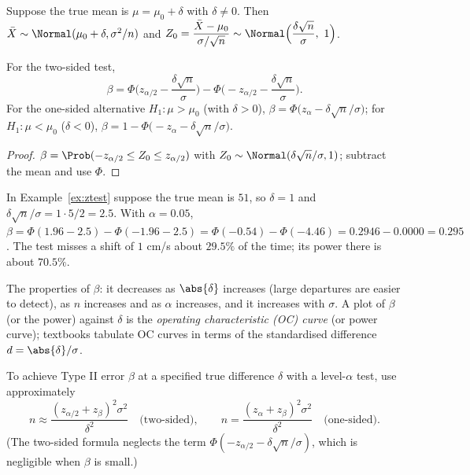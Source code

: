 Suppose the true mean is $\mu=\mu_0+\delta$ with $\delta\ne0$. Then $\bar{X}\sim\Normal(\mu_0+\delta,\sigma^2/n)$ and $Z_0=\dfrac{\bar{X}-\mu_0}{\sigma/\sqrt n}\sim\Normal\Big(\dfrac{\delta\sqrt n}\sigma,\ 1\Big)$.

\begin{theorem}\label{thm:beta-z}
For the two-sided test,
\[ \beta=\Phi\Big(z_{\alpha/2}-\frac{\delta\sqrt n}\sigma\Big)-\Phi\Big(-z_{\alpha/2}-\frac{\delta\sqrt n}\sigma\Big). \]
For the one-sided alternative $H_1:\mu>\mu_0$ (with $\delta>0$), $\beta=\Phi\big(z_\alpha-\delta\sqrt n/\sigma\big)$; for $H_1:\mu<\mu_0$ ($\delta<0$), $\beta=1-\Phi\big(-z_\alpha-\delta\sqrt n/\sigma\big)$.
\end{theorem}

\begin{proof}
$\beta=\Prob(-z_{\alpha/2}\le Z_0\le z_{\alpha/2})$ with $Z_0\sim\Normal(\delta\sqrt n/\sigma,1)$; subtract the mean and use $\Phi$.
\end{proof}

\begin{example}\label{ex:beta}
In Example~\ref{ex:ztest} suppose the true mean is $51$, so $\delta=1$ and $\delta\sqrt n/\sigma=1\cdot5/2=2.5$. With $\alpha=0.05$, $\beta=\Phi(1.96-2.5)-\Phi(-1.96-2.5)=\Phi(-0.54)-\Phi(-4.46)=0.2946-0.0000=0.295$. The test misses a shift of $1$ cm/s about $29.5\%$ of the time; its power there is about $70.5\%$.
\end{example}

The properties of $\beta$: it decreases as $\abs{\delta}$ increases (large departures are easier to detect), as $n$ increases and as $\alpha$ increases, and it increases with $\sigma$. A plot of $\beta$ (or the power) against $\delta$ is the \emph{operating characteristic (OC) curve} (or power curve); textbooks tabulate OC curves in terms of the standardised difference $d=\abs{\delta}/\sigma$.

\begin{theorem}\label{thm:samplesize-test}
To achieve Type II error $\beta$ at a specified true difference $\delta$ with a level-$\alpha$ test, use approximately
\[ n\approx\frac{(z_{\alpha/2}+z_\beta)^2\sigma^2}{\delta^2}\quad\text{(two-sided)},\qquad n=\frac{(z_\alpha+z_\beta)^2\sigma^2}{\delta^2}\quad\text{(one-sided)}. \]
(The two-sided formula neglects the term $\Phi(-z_{\alpha/2}-\delta\sqrt n/\sigma)$, which is negligible when $\beta$ is small.)
\end{theorem}

